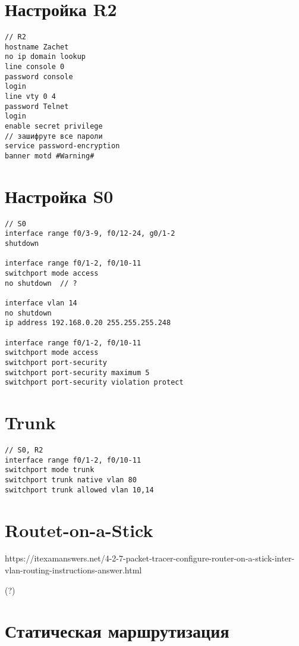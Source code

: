 \section{Настройка R2}

\begin{verbatim}
// R2
hostname Zachet
no ip domain lookup
line console 0
password console
login
line vty 0 4
password Telnet
login
enable secret privilege
// зашифруте все пароли
service password-encryption
banner motd #Warning#
\end{verbatim}

\section{Настройка S0}

\begin{verbatim}
// S0
interface range f0/3-9, f0/12-24, g0/1-2
shutdown

interface range f0/1-2, f0/10-11
switchport mode access
no shutdown  // ?

interface vlan 14
no shutdown
ip address 192.168.0.20 255.255.255.248

interface range f0/1-2, f0/10-11
switchport mode access
switchport port-security
switchport port-security maximum 5
switchport port-security violation protect
\end{verbatim}

\section{Trunk}

\begin{verbatim}
// S0, R2
interface range f0/1-2, f0/10-11
switchport mode trunk
switchport trunk native vlan 80
switchport trunk allowed vlan 10,14
\end{verbatim}

\section{Routet-on-a-Stick}

https://itexamanswers.net/4-2-7-packet-tracer-configure-router-on-a-stick-inter-vlan-routing-instructions-answer.html

(?)

\section{Статическая маршрутизация}

